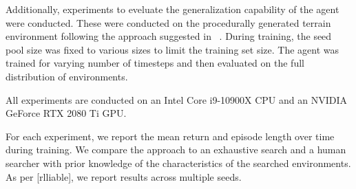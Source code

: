 Additionally, experiments to eveluate the generalization capability of the agent were conducted.
These were conducted on the procedurally generated terrain environment following the approach suggested in ~\cite{procgen}.
During training, the seed pool size was fixed to various sizes to limit the training set size.
The agent was trained for varying number of timesteps and then evaluated on the full distribution of environments.

All experiments are conducted on an Intel Core i9-10900X CPU and an NVIDIA GeForce RTX 2080 Ti GPU.

For each experiment, we report the mean return and episode length over time during training.
We compare the approach to an exhaustive search and a human searcher with prior knowledge of the characteristics of the searched environments.
As per [rlliable], we report results across multiple seeds.

















